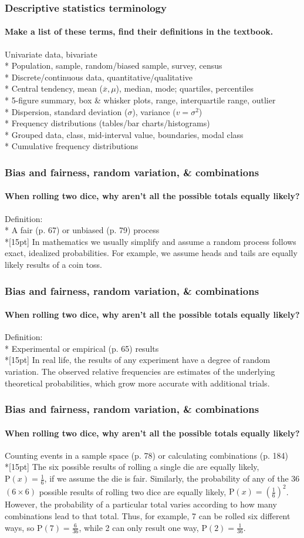 \documentclass{beamer}
\begin{document}
\frame
{
  \frametitle{Descriptive statistics terminology}
  \framesubtitle{Make a list of these terms, find their definitions in the textbook.}
  
  Univariate data, bivariate\\*
  Population, sample, random/biased sample, survey, census\\*
  Discrete/continuous data, quantitative/qualitative\\* 
  Central tendency, mean ($\overline{x}, \mu$), median, mode; quartiles, percentiles\\*
  5-figure summary, box \& whisker plots, range, interquartile range, outlier\\*
  Dispersion, standard deviation ($\sigma$), variance ($v=\sigma^2$)\\*
  Frequency distributions (tables/bar charts/histograms)\\*
  Grouped data, class, mid-interval value, boundaries, modal class\\*
  Cumulative frequency distributions

  
}

\frame
{
  \frametitle{Bias and fairness, random variation, \& combinations}
  \framesubtitle{When rolling two dice, why aren't all the possible totals equally likely?}
  Definition:\\*
  A \alert{fair} (p. 67) or \alert{unbiased} (p. 79) process \\*[15pt]
  In mathematics we usually simplify and assume a random process follows exact, idealized probabilities. For example, we assume heads and tails are equally likely results of a coin toss.
  
}

\frame
{
  \frametitle{Bias and fairness, random variation, \& combinations}
  \framesubtitle{When rolling two dice, why aren't all the possible totals equally likely?}
  Definition:\\*
  \alert{Experimental} or \alert{empirical} (p. 65) results \\*[15pt]
  In real life, the results of any experiment have a degree of \alert{random variation}. The observed relative frequencies are estimates of the underlying theoretical probabilities, which grow more accurate with additional trials.
  
}

\frame
{
  \frametitle{Bias and fairness, random variation, \& combinations}
  \framesubtitle{When rolling two dice, why aren't all the possible totals equally likely?}
  Counting events in a \alert{sample space} (p. 78) or calculating \alert{combinations} (p. 184) \\*[15pt]
  The six possible results of rolling a single die are equally likely, $\mathrm P(x)=\frac{1}{6}$, if we assume the die is fair. Similarly, the probability of any of the 36 $(6 \times 6)$ possible results of rolling two dice are equally likely, $\mathrm P(x)=(\frac{1}{6})^2$. However, the probability of a particular total varies according to how many combinations lead to that total. Thus, for example, 7 can be rolled six different ways, so $\mathrm P(7)=\frac{6}{36}$, while 2 can only result one way, $\mathrm P(2)=\frac{1}{36}$.
  
}
\end{document}
